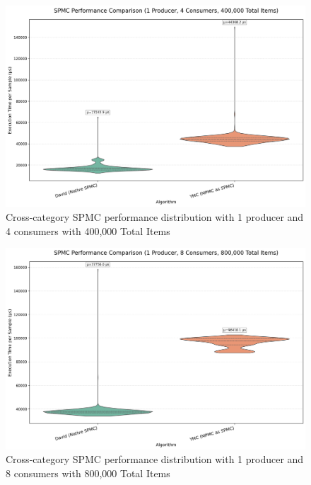 \begin{figure}[H]
\centering
\caption{Cross-category SPMC performance distribution with 1 producer and 4 consumers with 400,000 Total Items}
\label{fig:cross-spmc-violin-4c}
\includegraphics[width=\textwidth]{images/results/best_in_spmc_performance_violin_1P4C.png}
\end{figure}

\begin{figure}[H]
\centering
\caption{Cross-category SPMC performance distribution with 1 producer and 8 consumers with 800,000 Total Items}
\label{fig:cross-spmc-violin-8c}
\includegraphics[width=\textwidth]{images/results/best_in_spmc_performance_violin_1P8C.png}
\end{figure}